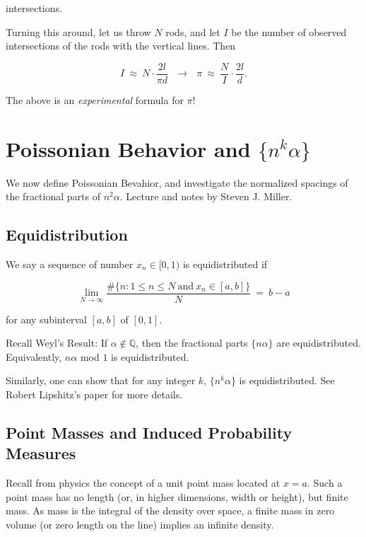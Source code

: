 \documentclass[12pt,letterpaper]{report}
\newcommand\be{\begin{equation}}
\newcommand\ee{\end{equation}}
\newcommand{\Q}{\mathbb{Q}}
\begin{document}
intersections.

Turning this around, let us throw $N$ rods, and let $I$ be the
number of observed intersections of the rods with the vertical
lines. Then

\be I \ \approx \ N \cdot \frac{2l}{\pi d} \ \ \ \to \ \ \ \pi \
\approx \ \frac{N}{I} \cdot \frac{2l}{d}. \ee

The above is an \emph{experimental} formula for $\pi$!




\chapter{Poissonian Behavior and $\{n^k \alpha\}$}

We now define Poissonian Bevahior, and investigate the normalized
spacings of the fractional parts of $n^2 \alpha$. Lecture and
notes by Steven J. Miller.


\section{Equidistribution}

We say a sequence of number $x_n \in [0,1)$ is equidistributed if

\be \lim_{N \to \infty} \frac{ \#\{n: 1 \le n \le N \ \text{and} \
x_n \in [a,b] \} }{N} \ = \ b - a \ee

for any subinterval $[a,b]$ of $[0,1]$.

Recall Weyl's Result: If $\alpha \not\in \Q$, then the fractional
parts $\{n \alpha\}$ are equidistributed. Equivalently, $n\alpha$
mod $1$ is equidistributed.

Similarly, one can show that for any integer $k$, $\{n^k \alpha\}$
is equidistributed. See Robert Lipshitz's paper for more details.


\section{Point Masses and Induced Probability Measures}

Recall from physics the concept of a unit point mass located at $x
= a$. Such a point mass has no length (or, in higher dimensions,
width or height), but finite mass. As mass is the integral of the
density over space, a finite mass in zero volume (or zero length
on the line) implies an infinite density.
\end{document}

